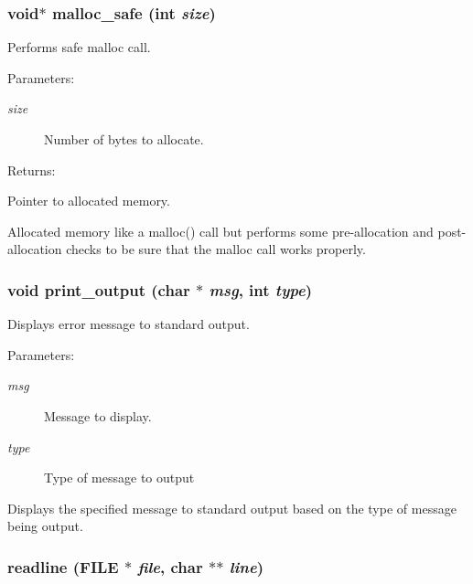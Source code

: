 \subsubsection{\setlength{\rightskip}{0pt plus 5cm}void$\ast$ malloc\_\-safe (int {\em size})}\label{util_8c_a12}


Performs safe malloc call.

\begin{Desc}
\item[Parameters: ]\par
\begin{description}
\item[{\em 
size}]Number of bytes to allocate.\end{description}
\end{Desc}
\begin{Desc}
\item[Returns: ]\par
Pointer to allocated memory.\end{Desc}
Allocated memory like a malloc() call but performs some pre-allocation and post-allocation checks to be sure that the malloc call works properly. 
\subsubsection{\setlength{\rightskip}{0pt plus 5cm}void print\_\-output (char $\ast$ {\em msg}, int {\em type})}\label{util_8c_a4}


Displays error message to standard output.

\begin{Desc}
\item[Parameters: ]\par
\begin{description}
\item[{\em 
msg}]Message to display. \item[{\em 
type}]Type of message to output\end{description}
\end{Desc}
Displays the specified message to standard output based on the type of message being output. 
\subsubsection{ readline (FILE $\ast$ {\em file}, char $\ast$$\ast$ {\em line})}\label{util_8c_a9}


